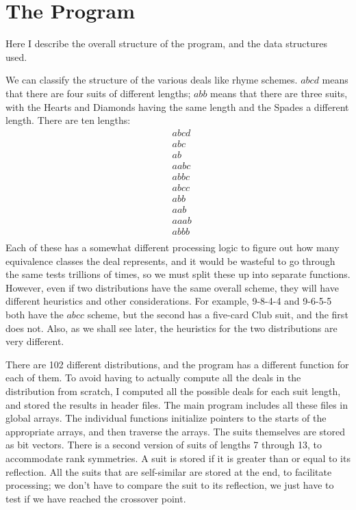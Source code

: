 \documentclass [12pt, letterpaper] {article}
\begin{document}
\section*{The Program}

Here I describe the overall structure of the program, and the data structures used.

We can classify the structure of the various deals like rhyme schemes.  $abcd$ means that there are four suits of different
lengths; $abb$ means that there are three suits, with the Hearts and Diamonds having the same length and the Spades a different length.
There are ten lengths:
\begin{align*}
        &abcd\\
        &abc\\
        &ab\\
        &aabc\\
        &abbc\\
        &abcc\\
        &abb\\
        &aab\\
        &aaab\\
        &abbb\\
\end{align*}
Each of these has a somewhat different processing logic to figure out how many equivalence classes the deal represents,
and it would be wasteful to go through the same tests trillions of times, so we must split these up into separate functions.
However, even if two distributions have the same overall scheme, they will have different heuristics and other considerations.
For example, 9-8-4-4 and 9-6-5-5 both have the $abcc$ scheme, but the second has a five-card Club suit, and the first does not.  
Also, as we shall see later, the heuristics for the two distributions are very different.

There are 102 different distributions, and the program has a different function for each of them.  To avoid having to 
actually compute all the deals in the distribution from scratch, I computed all the possible deals for each suit length, 
and stored the results in header files.  The main program includes all these files in global arrays.  The individual functions
initialize pointers to the starts of the appropriate arrays, and then traverse the arrays.  The suits themselves are stored
as bit vectors.  There is a second version of suits of lengths 7 through 13, to accommodate rank symmetries.  
A suit is stored if it is greater than or equal to its reflection.  All the suits that are self-similar are stored
at the end, to facilitate processing; we don't have to compare the suit to its reflection, we just have to test
if we have reached the crossover point.
\end{document}
